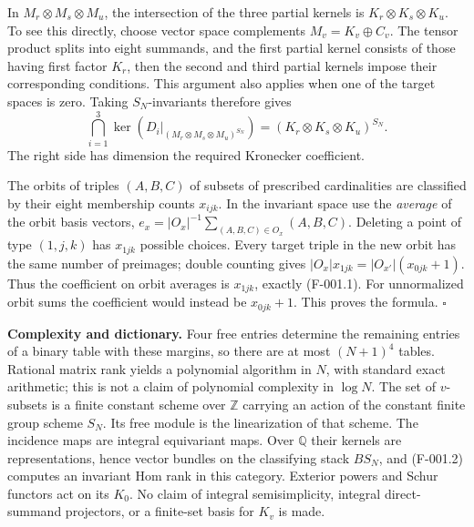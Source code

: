 In $M_r\otimes M_s\otimes M_u$, the intersection of the three partial
kernels is $K_r\otimes K_s\otimes K_u$. To see this directly, choose vector
space complements $M_v=K_v\oplus C_v$. The tensor product splits into eight
summands, and the first partial kernel consists of those having first factor
$K_r$, then the second and third partial kernels impose their corresponding
conditions. This argument also applies when one of the target spaces is
zero. Taking $S_N$-invariants therefore gives
\[
 \bigcap_{i=1}^3\ker(D_i|_{(M_r\otimes M_s\otimes M_u)^{S_N}})
  =(K_r\otimes K_s\otimes K_u)^{S_N}.
\]
The right side has dimension the required Kronecker coefficient.

The orbits of triples $(A,B,C)$ of subsets of prescribed cardinalities are
classified by their eight membership counts $x_{ijk}$. In the invariant
space use the \emph{average} of the orbit basis vectors,
$e_x=|O_x|^{-1}\sum_{(A,B,C)\in O_x}(A,B,C)$.
Deleting a point of type $(1,j,k)$ has $x_{1jk}$ possible choices.
Every target triple in the new orbit has the same number of preimages;
double counting gives
$|O_x|x_{1jk}=|O_{x'}|(x_{0jk}+1)$.
Thus the coefficient on orbit averages is $x_{1jk}$, exactly (F-001.1).
For unnormalized orbit sums the coefficient would instead be $x_{0jk}+1$.
This proves the formula. \hfill$\square$

\textbf{Complexity and dictionary.}
Four free entries determine the remaining entries of a binary table with
these margins, so there are at most $(N+1)^4$ tables. Rational matrix rank
yields a polynomial algorithm in $N$, with standard exact arithmetic; this
is not a claim of polynomial complexity in $\log N$.
The set of $v$-subsets is a finite constant scheme over $\mathbb Z$ carrying
an action of the constant finite group scheme $S_N$. Its free module is the
linearization of that scheme. The incidence maps are integral equivariant
maps. Over $\mathbb Q$ their kernels are representations, hence vector bundles
on the classifying stack $BS_N$, and (F-001.2) computes an invariant Hom rank
in this category. Exterior powers and Schur functors act on its $K_0$.
No claim of integral semisimplicity, integral direct-summand projectors, or a
finite-set basis for $K_v$ is made.

